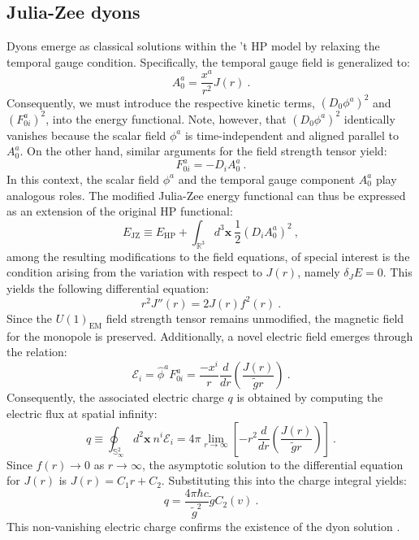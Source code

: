 \documentclass[a4paper,11pt]{article}
\begin{document}
\subsection{Julia-Zee dyons}
Dyons emerge as classical solutions within the 't HP model by relaxing the temporal gauge condition. Specifically, the temporal gauge field is generalized to:
\begin{equation}
    A_0^a=\frac{x^a}{r^2}J(r)\ .
\end{equation}
Consequently, we must introduce the respective kinetic terms, $(D_{0}\phi^{a})^{2}$ and $(F_{0i}^{a})^{2}$, into the energy functional. Note, however, that $(D_{0}\phi^{a})^{2}$ identically vanishes because the scalar field $\phi^{a}$ is time-independent and aligned parallel to $A_{0}^{a}$. On the other hand, similar arguments for the field strength tensor yield:
\begin{equation}
    F_{0i}^a=-D_i A_0^a\ .
\end{equation}
In this context, the scalar field $\phi^{a}$ and the temporal gauge component $A_{0}^{a}$ play analogous roles. The modified Julia-Zee energy functional can thus be expressed as an extension of the original HP functional:
\begin{equation}
    E_{\text{JZ}}\equiv E_{\text{HP}}+\int_{\mathbb R^3} d^3 \boldsymbol{x}\ \frac{1}{2}(D_iA^a_0)^2\ ,
\end{equation} 
among the resulting modifications to the field equations, of special interest is the condition arising from the variation with respect to $J(r)$, namely $\delta_{J}E=0$. This yields the following differential equation:
\begin{equation}\label{edo}
    r^2 J''(r)=2J(r)f^2(r)\ .
\end{equation}
Since the $U(1)_{\text{EM}}$ field strength tensor remains unmodified, the magnetic field for the monopole is preserved. Additionally, a novel electric field emerges through the relation:
\begin{equation}
    \mathcal E_i=\hat{\phi}^a F^a_{0i}=\frac{-x^i}{r}\frac{d}{dr}\left(\frac{J(r)}{\tilde g r} \right)\ .
\end{equation}
Consequently, the associated electric charge $q$ is obtained by computing the electric flux at spatial infinity:
\begin{equation}
q\equiv \oint_{\mathbb S^2_\infty}d^2 \boldsymbol x\ n^i \mathcal E_i=4\pi \lim_{r\to \infty}\left[-r^2 \frac{d}{dr}\left(\frac{J(r)}{\tilde g r} \right) \right]\ .
\end{equation}
Since $f(r) \to 0$ as $r \to \infty$, the asymptotic solution to the differential equation for $J(r)$ is $J(r) = C_{1}r + C_{2}$. Substituting this into the charge integral yields:
\begin{equation}
    q= \frac{4\pi \hbar c}{\tilde g^2}\tilde g C_2(v)\ .
\end{equation}
This non-vanishing electric charge confirms the existence of the dyon solution \cite{julia1975}.
\end{document}
